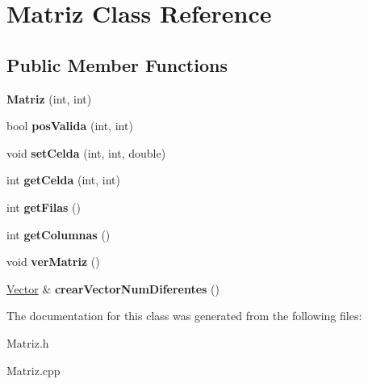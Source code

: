 \hypertarget{class_matriz}{}\section{Matriz Class Reference}
\label{class_matriz}
\subsection*{Public Member Functions}
\begin{DoxyCompactItemize}
\item 
\mbox{\label{class_matriz_a27f5776ea6c1da130f09fa40dcf7fa56}} 
{\bfseries Matriz} (int, int)
\item 
\mbox{\label{class_matriz_afee5177f97dc440f0609a570d13d613b}} 
bool {\bfseries pos\+Valida} (int, int)
\item 
\mbox{\label{class_matriz_adc65b1d3e2d3c27fd6a7b13a43a7b78b}} 
void {\bfseries set\+Celda} (int, int, double)
\item 
\mbox{\label{class_matriz_aa42668ffb77fff15911248fbc4d63ad7}} 
int {\bfseries get\+Celda} (int, int)
\item 
\mbox{\label{class_matriz_ad37b520e052d97d27700b38c164a40cd}} 
int {\bfseries get\+Filas} ()
\item 
\mbox{\label{class_matriz_ab3f5136ad19e2caa059d3cdd3a00067b}} 
int {\bfseries get\+Columnas} ()
\item 
\mbox{\label{class_matriz_ac0195dd0226757963d6ef0f7970fd38b}} 
void {\bfseries ver\+Matriz} ()
\item 
\mbox{\label{class_matriz_acecb38101593d3ffa3e85d20f22733dc}} 
\hyperlink{class_vector}{Vector} \& {\bfseries crear\+Vector\+Num\+Diferentes} ()
\end{DoxyCompactItemize}


The documentation for this class was generated from the following files\+:\begin{DoxyCompactItemize}
\item 
Matriz.\+h\item 
Matriz.\+cpp\end{DoxyCompactItemize}
